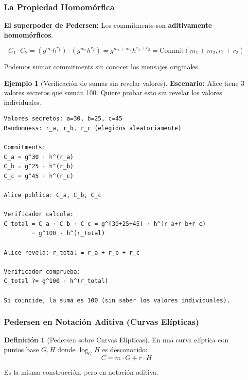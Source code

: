 \documentclass[11pt,a4paper,twoside,openright]{book}
\theoremstyle{definition}
\newtheorem{definition}{Definición}[chapter]
\newtheorem{example}{Ejemplo}[chapter]
\theoremstyle{plain}
\theoremstyle{remark}
\begin{document}
\subsubsection{La Propiedad Homomórfica}

\begin{keyidea}
\textbf{El superpoder de Pedersen:} Los commitments son \textbf{aditivamente homomórficos}.

\[ C_1 \cdot C_2 = (g^{m_1} h^{r_1}) \cdot (g^{m_2} h^{r_2}) = g^{m_1 + m_2} h^{r_1 + r_2} = \text{Commit}(m_1 + m_2, r_1 + r_2) \]

Podemos sumar commitments sin conocer los mensajes originales.
\end{keyidea}

\begin{example}[Verificación de sumas sin revelar valores]
\textbf{Escenario:} Alice tiene 3 valores secretos que suman 100. Quiere probar esto sin revelar los valores individuales.

\begin{verbatim}
Valores secretos: a=30, b=25, c=45
Randomness: r_a, r_b, r_c (elegidos aleatoriamente)

Commitments:
C_a = g^30 · h^(r_a)
C_b = g^25 · h^(r_b)
C_c = g^45 · h^(r_c)

Alice publica: C_a, C_b, C_c

Verificador calcula:
C_total = C_a · C_b · C_c = g^(30+25+45) · h^(r_a+r_b+r_c)
        = g^100 · h^(r_total)

Alice revela: r_total = r_a + r_b + r_c

Verificador comprueba:
C_total ?= g^100 · h^(r_total)

Si coincide, la suma es 100 (sin saber los valores individuales).
\end{verbatim}
\end{example}

\subsubsection{Pedersen en Notación Aditiva (Curvas Elípticas)}

\begin{definition}[Pedersen sobre Curvas Elípticas]
En una curva elíptica con puntos base $G, H$ donde $\log_G H$ es desconocido:
\[ C = m \cdot G + r \cdot H \]

Es la misma construcción, pero en notación aditiva.
\end{definition}
\end{document}
